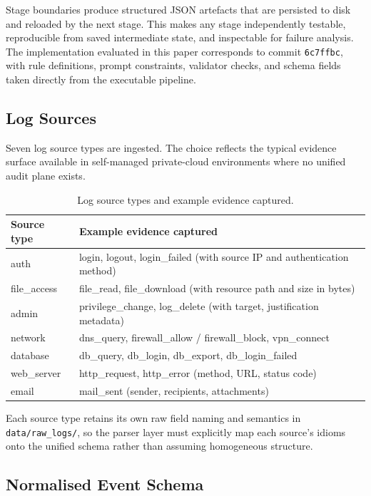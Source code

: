 \documentclass[conference]{IEEEtran}
\begin{document}
Stage boundaries produce structured JSON artefacts that are persisted to disk and reloaded by the next stage. This makes any stage independently testable, reproducible from saved intermediate state, and inspectable for failure analysis. The implementation evaluated in this paper corresponds to commit \texttt{6c7ffbc}, with rule definitions, prompt constraints, validator checks, and schema fields taken directly from the executable pipeline.

\subsection{Log Sources}
\label{sec:logsources}

Seven log source types are ingested. The choice reflects the typical evidence surface available in self-managed private-cloud environments where no unified audit plane exists.

\begin{table}[ht]
\centering
\caption{Log source types and example evidence captured.}
\label{tab:sources}
\small
\begin{tabular}{L{0.22\columnwidth}L{0.70\columnwidth}}
\toprule
\textbf{Source type} & \textbf{Example evidence captured} \\
\midrule
auth        & login, logout, login\_failed (with source IP and authentication method) \\
file\_access & file\_read, file\_download (with resource path and size in bytes) \\
admin       & privilege\_change, log\_delete (with target, justification metadata) \\
network     & dns\_query, firewall\_allow / firewall\_block, vpn\_connect \\
database    & db\_query, db\_login, db\_export, db\_login\_failed \\
web\_server  & http\_request, http\_error (method, URL, status code) \\
email       & mail\_sent (sender, recipients, attachments) \\
\bottomrule
\end{tabular}
\end{table}

Each source type retains its own raw field naming and semantics in \texttt{data/raw\_logs/}, so the parser layer must explicitly map each source's idioms onto the unified schema rather than assuming homogeneous structure.

\subsection{Normalised Event Schema}
\label{sec:schema}
\end{document}

